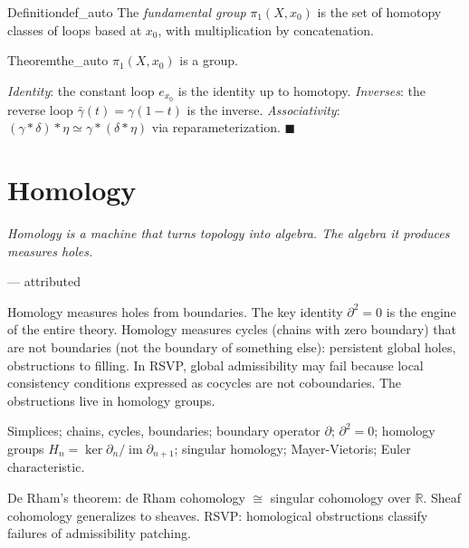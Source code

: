 \documentclass[12pt, twoside, openright, a4paper]{book}
\renewenvironment{proof}{%
  \par\medskip\noindent{\color{RSVPgreen}\bfseries\sffamily Proof.}\enspace\ignorespaces
}{\hfill{\color{RSVPgreen}$\blacksquare$}\par\medskip}
\newcommand{\sidenote}[1]{\marginnote{#1}}
\newcommand{\R}{\mathbb{R}}
\DeclareMathOperator{\im}{im}
\newcommand{\chapterepigraph}[2]{%
  \vspace{-8pt}\begin{center}\begin{minipage}{0.78\textwidth}
  \small\itshape #1\begin{flushright}--- #2\end{flushright}
  \end{minipage}\end{center}\vspace{10pt}}
\begin{document}
\begin{definition}{Definition}{def_auto}
The \emph{fundamental group} $\pi_1(X,x_0)$ is the set of homotopy classes of loops based at $x_0$, with multiplication by concatenation.
\end{definition}

\begin{theorem}{Theorem}{the_auto}
$\pi_1(X,x_0)$ is a group.
\end{theorem}
\begin{proof}
\textit{Identity}: the constant loop $e_{x_0}$ is the identity up to homotopy.
\textit{Inverses}: the reverse loop $\bar\gamma(t) = \gamma(1-t)$ is the inverse.
\textit{Associativity}: $(\gamma * \delta) * \eta \simeq \gamma * (\delta * \eta)$ via reparameterization.
\end{proof}

\chapter{Homology}
\chapterepigraph{Homology is a machine that turns topology into algebra. The algebra it produces measures holes.}{attributed}
\sidenote{Recommended:\\Hatcher, Ch.\,2--3}
\label{ch:homology}

\begin{motivation}
Homology measures holes from boundaries.
The key identity $\partial^2 = 0$ is the engine of the entire theory.
Homology measures cycles (chains with zero boundary) that are not boundaries (not the boundary of something else): persistent global holes, obstructions to filling.
In RSVP, global admissibility may fail because local consistency conditions expressed as cocycles are not coboundaries.
The obstructions live in homology groups.
\end{motivation}

\begin{structures}
Simplices; chains, cycles, boundaries; boundary operator $\partial$; $\partial^2 = 0$; homology groups $H_n = \ker\partial_n/\im\partial_{n+1}$; singular homology; Mayer-Vietoris; Euler characteristic.
\end{structures}

\begin{dependencies}
De Rham's theorem: de Rham cohomology $\cong$ singular cohomology over $\R$.
Sheaf cohomology generalizes to sheaves.
RSVP: homological obstructions classify failures of admissibility patching.
\end{dependencies}
\end{document}
